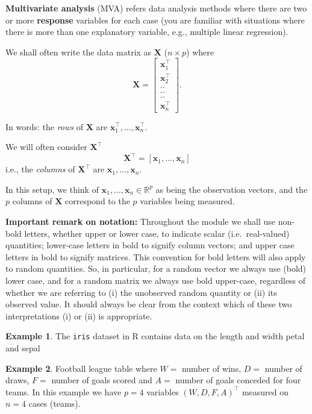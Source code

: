 \documentclass[]{book}
\theoremstyle{definition}
\theoremstyle{definition}
\newtheorem{example}{Example}[chapter]
\theoremstyle{definition}
\theoremstyle{remark}
\begin{document}
\textbf{Multivariate analysis} (MVA) refers data analysis methods where there are two or more \textbf{response} variables for each case (you are familiar with situations where there is more than one explanatory variable, e.g., multiple linear regression).

We shall often write the data matrix as \(\mathbf X\) (\(n \times p\)) where
\[
{\mathbf X}=\left[ \begin{array}{c}
\boldsymbol x_1^\top\\
\boldsymbol x_2^\top\\
..\\
..\\
..\\
\boldsymbol x_n^\top
\end{array}\right ].
\]

In words: the \emph{rows} of \(\mathbf X\) are \(\boldsymbol x_1^\top, \ldots , \boldsymbol x_n^\top\).

We will often consider \({\mathbf X}^\top\)
\[{\mathbf X}^\top= [ \boldsymbol x_1, \ldots , \boldsymbol x_n]\]
i.e., the \emph{columns} of \(\boldsymbol X^\top\) are
\(\boldsymbol x_1, \ldots , \boldsymbol x_n\).

In this setup, we think of \(\boldsymbol x_1, \ldots , \boldsymbol x_n \in \mathbb{R}^p\) as being the observation vectors, and the \(p\) columns of \(\mathbf X\)
correspond to the \(p\) variables being measured.

\textbf{Important remark on notation:} Throughout the module we shall use non-bold letters, whether upper or lower case, to indicate scalar (i.e.~real-valued) quantities; lower-case letters in bold to signify column vectors; and upper case letters in bold to signify matrices. This convention for bold letters will also apply to random quantities. So, in particular, for a random vector we always use (bold) lower case, and for a random matrix we always use bold upper-case, regardless of whether we are referring to (i) the unobserved random quantity or (ii) its observed value. It should always be clear from the context which of these two interpretations (i) or (ii) is appropriate.

\begin{example}
\protect\hypertarget{exm:unnamed-chunk-1}{}{\label{exm:unnamed-chunk-1} }The \texttt{iris} dataset in R contains data on the length and width petal and sepal
\end{example}

\begin{example}
\protect\hypertarget{exm:unnamed-chunk-2}{}{\label{exm:unnamed-chunk-2} }Football league table where \(W =\) number of wins, \(D =\) number of draws, \(F =\) number of goals scored and \(A =\) number of goals conceded for four teams.
In this example we have \(p=4\) variables \((W, D, F, A)^\top\) measured on \(n=4\) cases (teams).
\end{example}
\end{document}
